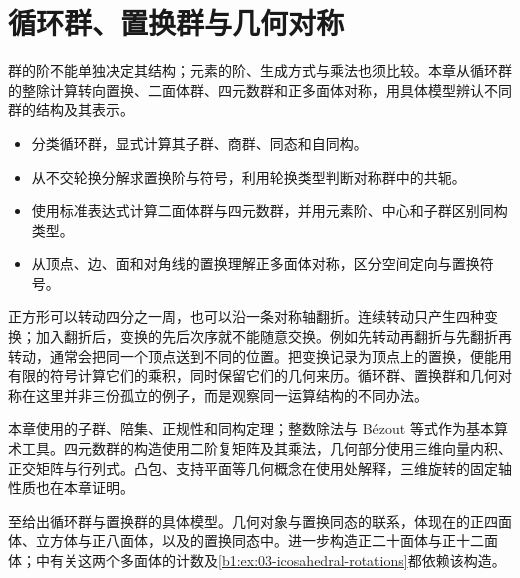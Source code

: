 
\chapter{循环群、置换群与几何对称}
\label{b1:ch:03}

\begin{chapterabstract}
	群的阶不能单独决定其结构；元素的阶、生成方式与乘法也须比较。本章从循环群的整除计算转向置换、二面体群、四元数群和正多面体对称，用具体模型辨认不同群的结构及其表示。
\end{chapterabstract}

\begin{learninggoals}
	\begin{itemize}
		\item 分类循环群，显式计算其子群、商群、同态和自同构。
		\item 从不交轮换分解求置换阶与符号，利用轮换类型判断对称群中的共轭。
		\item 使用标准表达式计算二面体群与四元数群，并用元素阶、中心和子群区别同构类型。
		\item 从顶点、边、面和对角线的置换理解正多面体对称，区分空间定向与置换符号。
	\end{itemize}
\end{learninggoals}

正方形可以转动四分之一周，也可以沿一条对称轴翻折。连续转动只产生四种变换；加入翻折后，变换的先后次序就不能随意交换。例如先转动再翻折与先翻折再转动，通常会把同一个顶点送到不同的位置。把变换记录为顶点上的置换，便能用有限的符号计算它们的乘积，同时保留它们的几何来历。循环群、置换群和几何对称在这里并非三份孤立的例子，而是观察同一运算结构的不同办法。

\ProseParagraphBreak

本章使用的子群、陪集、正规性和同构定理；整数除法与 Bézout 等式作为基本算术工具。四元数群的构造使用二阶复矩阵及其乘法，几何部分使用三维向量内积、正交矩阵与行列式。凸包、支持平面等几何概念在使用处解释，三维旋转的固定轴性质也在本章证明。

\ProseParagraphBreak
{}至给出循环群与置换群的具体模型。几何对象与置换同态的联系，体现在的正四面体、立方体与正八面体，以及的置换同态中。进一步构造正二十面体与正十二面体；中有关这两个多面体的计数及\cref{b1:ex:03-icosahedral-rotations}都依赖该构造。


